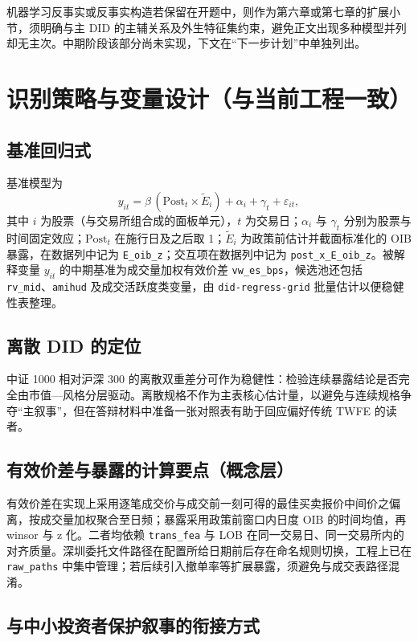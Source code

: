 \documentclass[UTF8, a4paper, 12pt]{ctexart}
\newcommand{\id}[1]{{\footnotesize\nolinkurl{#1}}}
\begin{document}
机器学习反事实或反事实构造若保留在开题中，则作为第六章或第七章的扩展小节，须明确与主 DID 的主辅关系及外生特征集约束，避免正文出现多种模型并列却无主次。中期阶段该部分尚未实现，下文在“下一步计划”中单独列出。

\section{识别策略与变量设计（与当前工程一致）}

\subsection{基准回归式}

基准模型为
\begin{equation}
y_{it} = \beta\, (\mathrm{Post}_t \times \tilde{E}_i) + \alpha_i + \gamma_t + \varepsilon_{it},
\end{equation}
其中 \(i\) 为股票（与交易所组合成的面板单元），\(t\) 为交易日；\(\alpha_i\) 与 \(\gamma_t\) 分别为股票与时间固定效应；\(\mathrm{Post}_t\) 在施行日及之后取 1；\(\tilde{E}_i\) 为政策前估计并截面标准化的 OIB 暴露，在数据列中记为 \id{E_oib_z}；交互项在数据列中记为 \id{post_x_E_oib_z}。被解释变量 \(y_{it}\) 的中期基准为成交量加权有效价差 \id{vw_es_bps}，候选池还包括 \id{rv_mid}、\id{amihud} 及成交活跃度类变量，由 \id{did-regress-grid} 批量估计以便稳健性表整理。

\subsection{离散 DID 的定位}

中证 1000 相对沪深 300 的离散双重差分可作为稳健性：检验连续暴露结论是否完全由市值—风格分层驱动。离散规格不作为主表核心估计量，以避免与连续规格争夺“主叙事”，但在答辩材料中准备一张对照表有助于回应偏好传统 TWFE 的读者。

\subsection{有效价差与暴露的计算要点（概念层）}

有效价差在实现上采用逐笔成交价与成交前一刻可得的最佳买卖报价中间价之偏离，按成交量加权聚合至日频；暴露采用政策前窗口内日度 OIB 的时间均值，再 winsor 与 z 化。二者均依赖 \id{trans_fea} 与 LOB 在同一交易日、同一交易所内的对齐质量。深圳委托文件路径在配置所给日期前后存在命名规则切换，工程上已在 \id{raw_paths} 中集中管理；若后续引入撤单率等扩展暴露，须避免与成交表路径混淆。

\subsection{与中小投资者保护叙事的衔接方式}
\end{document}

